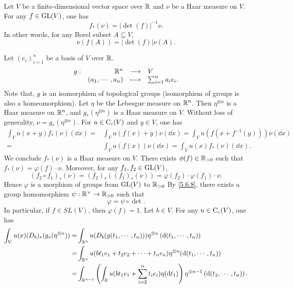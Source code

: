 \begin{theoremenv}\label{thm:5.6.9}
    Let $V$ be a finite-dimensional vector space over $\mathbb{R}$ and $\nu$ be a Haar measure on $V$.
    For any $f \in \operatorname{\mathrm{GL}}(V)$, one has
    $$f_*(\nu) = \left| \det(f)\right|^{-1} \nu.$$
    In other words, for any Borel subset $A \subseteq V$,
    $$\nu(f(A)) = \left| \det(f)\right| \nu(A).$$
\end{theoremenv}
\begin{proofenv}
    Let $(e_i)_{i=1}^n$ be a basis of $V$ over $\mathbb{R}$.
    $$\begin{array}{rrcl}
        g : & \mathbb{R}^n  & \longrightarrow & V\\
        & (a_1,\cdots,a_n) & \longmapsto & \sum_{i=1}^{n} a_i e_i.
    \end{array}$$
    Note that, $g$ is an isomorphism of topological groups (isomorphism of groups is also a homeomorphism).
    Let $\eta$ be the Lebesgue measure on $\mathbb{R}^n$.
    Then $\eta^{\otimes n}$ is a Haar measure on $\mathbb{R}^n$,
    and $g_*(\eta^{\otimes n})$ is a Haar measure on $V$.
    Without loss of generality, $\nu = g_*(\eta^{\otimes n})$.
    For $u \in \operatorname{C_{c}}(V)$ and $y \in V$, one has
    $$\begin{aligned}
        \int_{V} u(x + y)f_*(\nu)(\dd x) = & \int_{V} u(f(x) + y) \nu(\dd x) = \int_{V} u(f(x + f^{-1}(y))) \nu(\dd x)\\
        = & \int_{V} u(f(x)) \nu(\dd x) = \int_{V} u(x)f_*(\nu)(\dd x).
    \end{aligned}$$
    We conclude $f_*(\nu)$ is a Haar measure on $V$.
    There exists $\phi(f) \in \mathbb{R}_{>0}$ such that $f_*(\nu) = \varphi(f) \cdot \nu$.
    Moreover, for any $f_1,f_2 \in \operatorname{\mathrm{GL}}(V)$,
    $$\left(f_2 \circ f_1\right)_* (\nu) = \left(f_2\right)_*\left((f_1)_*(\nu)\right) = \varphi(f_2) \cdot \varphi(f_1) \cdot \nu.$$
    Hence $\varphi$ is a morphism of groups from $\operatorname{\mathrm{GL}}(V)$ to $\mathbb{R}_{>0}$
    By \ref{5.6.8}, there exists a group homomorphism $\psi : \mathbb{R}^\times \rightarrow \mathbb{R}_{>0}$ such that
    $$\varphi = \psi \circ \det.$$
    In particular, if $f \in SL(V)$, then $\varphi(f) = 1$.
    Let $b \in V$.
    For any $u \in \operatorname{C_{c}}(V)$, one has 
    $$\begin{aligned}
        \int_{V} u(x) (D_{b})_* (g_*(\eta^{\otimes n})) = & \int_{\mathbb{R}^n} u(D_b(g(t_1,\cdots,t_n)))\eta^{\otimes n} \left(\mathrm{d} (t_1,\cdots,t_n)\right)\\
        = & \int_{\mathbb{R}^n} u(bt_1e_1 + t_2e_2 + \cdots + t_n e_n)\eta^{\otimes n}(\mathrm{d} (t_1,\cdots,t_n))\\
        = & \int_{\mathbb{R}^{n-1}}\left(\int_{\mathbb{R}} u(bt_1e_1 + \sum_{i=2}^{n}t_ie_i)\eta(\mathrm{d} t_1)\right) \eta^{\otimes n-1} \left(\mathrm{d} (t_2,\cdots,t_n)\right).
    \end{aligned}$$
\end{proofenv}

